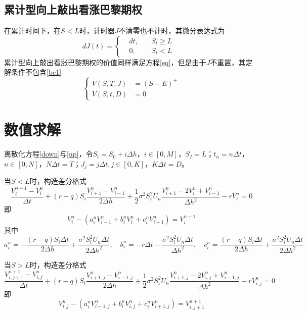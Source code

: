 \documentclass{ctexart} %
\begin{document}
\subsection{累计型向上敲出看涨巴黎期权}
在累计时间下，在$S<L$时，计时器$J$不清零也不计时，其微分表达式为
\begin{equation}
dJ(t)=\left\{
\begin{aligned}
&dt,\quad &S_t\geq L \\
&0,\quad&S_t<L&
\end{aligned}
\right.
\end{equation}
累计型向上敲出看涨巴黎期权的价值同样满足方程\eqref{eq}，但是由于$J$不重置，其定解条件不包含\eqref{bc1}
\begin{equation}
\label{bc2}
\left\{
\begin{aligned}
V(S,T,J)&=(S-E)^{+} \\
V(S,t,D)&=0
\end{aligned}
\right.
\end{equation}

\section{数值求解}
离散化方程\eqref{down}与\eqref{up}，令$S_i=S_0+i\Delta h$，$i\in[0,M]$，$S_{I}=L$；$t_n=n\Delta t$，$n\in[0,N]$，$N\Delta t=T$；$J_j=j\Delta t,j\in[0,K]$，$K\Delta t=D$。

当$S<L$时，构造差分格式
\begin{equation}
\frac{V^{n+1}_i-V^n_i}{\Delta t}+(r-q)S_i\frac{V^{n}_{i+1}-V^{n}_{i-1}}{2\Delta h}+\frac{1}{2}\sigma^2S_i^2U_{n}\frac{V_{i+1}^{n}-2V_i^{n}+V_{i-1}^{n}}{\Delta h^2}-rV^{n}_i=0
\end{equation}
即
\begin{equation}
\label{hcon1}
V^{n}_i-(a^n_iV^{n}_{i-1}+b^n_iV^{n}_i+c^n_iV^{n}_{i+1})=V^{n+1}_i
\end{equation}
其中
$$
a^n_i=-\frac{(r-q)S_i\Delta t}{2\Delta h}+\frac{\sigma^2S_i^2U_{n}\Delta t}{2\Delta h^2},\quad b^n_i=-r\Delta t-\frac{\sigma^2S_i^2U_{n}\Delta t}{\Delta h^2},\quad c^n_i=\frac{(r-q)S_i\Delta t}{2\Delta h}+\frac{\sigma^2S_i^2U_{n}\Delta t}{2\Delta h^2}
$$

当$S>L$时，构造差分格式
\begin{equation}
\frac{V^{n+1}_{i,j+1}-V^{n}_{i,j}}{\Delta t}+(r-q)S_i\frac{V^{n}_{i+1,j}-V^{n}_{i-1,j}}{2\Delta h}+\frac{1}{2}\sigma^2S_i^2U_{n}\frac{V_{i+1,j}^{n}-2V_{i,j}^{n}+V_{i-1,j}^{n}}{\Delta h^2}-rV^{n}_{i,j}=0
\end{equation}
即
\begin{equation}
\label{hcon2}
V^n_{i,j}-(a^n_iV^{n}_{i-1,j}+b^n_iV^{n}_{i,j}+c^n_iV^{n}_{i+1,j})=V^{n+1}_{i,j+1}
\end{equation}
\end{document}
